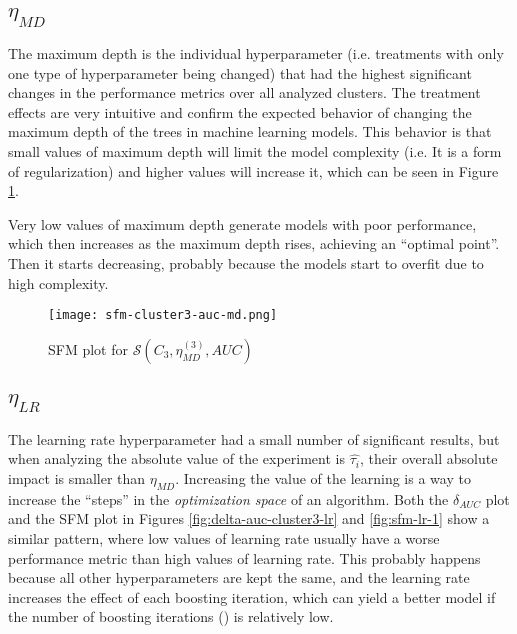 \subsection{\texorpdfstring{\Large$\eta_{MD}$}{}}
\label{subsec:analysis-md}

The maximum depth is the individual hyperparameter (i.e. treatments with only one type of hyperparameter being changed) that had the highest significant changes in the performance metrics over all analyzed clusters. The treatment effects are very intuitive and confirm the expected behavior of changing the maximum depth of the trees in machine learning models. This behavior is that small values of maximum depth will limit the model complexity (i.e. It is a form of regularization) and higher values will increase it, which can be seen in Figure \ref{fig:sfm-md-1}.

Very low values of maximum depth generate models with poor performance, which then increases as the maximum depth rises, achieving an ``optimal point''. Then it starts decreasing, probably because the models start to overfit due to high complexity.

\begin{figure}[H]
    \centering
    \texttt{[image: sfm-cluster3-auc-md.png]}
    \caption{SFM plot for $\mathcal{S}(C_3, \eta^{(3)}_{MD}, AUC)$}
    \label{fig:sfm-md-1}
\end{figure}


\subsection{\texorpdfstring{\Large$\eta_{LR}$}{}}

The learning rate hyperparameter had a small number of significant results, but when analyzing the absolute value of the experiment is $\hat{\tau_i}$, their overall absolute impact is smaller than $\eta_{MD}$. Increasing the value of the learning is a way to increase the ``steps'' in the \textit{optimization space} of an algorithm. Both the $\delta_{AUC}$ plot and the SFM plot in Figures \ref{fig:delta-auc-cluster3-lr} and \ref{fig:sfm-lr-1} show a similar pattern, where low values of learning rate usually have a worse performance metric than high values of learning rate. This probably happens because all other hyperparameters are kept the same, and the learning rate increases the effect of each boosting iteration, which can yield a better model if the number of boosting iterations () is relatively low.

